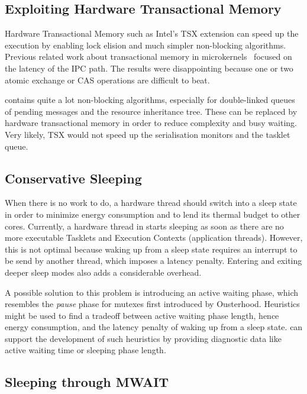 \subsection{Exploiting Hardware Transactional Memory}
Hardware Transactional Memory such as Intel's TSX extension can speed
up the execution by enabling lock elision and much simpler
non-blocking algorithms.  Previous related work about transactional
memory in
microkernels~\cite{smejkal2015transactional,fuchs2014hardware} focused
on the latency of the IPC path.  The results were disappointing
because one or two atomic exchange or CAS operations are difficult to
beat.

\mythos contains quite a lot non-blocking algorithms, especially for
double-linked queues of pending messages and the resource inheritance
tree. These can be replaced by hardware transactional memory in order
to reduce complexity and busy waiting. Very likely, TSX would not
speed up the serialisation monitors and the tasklet queue.

\subsection{Conservative Sleeping}

When there is no work to do, a hardware thread should switch into a
sleep state in order to minimize energy consumption and to lend its
thermal budget to other cores.  Currently, a hardware thread in
\mythos starts sleeping as soon as there are no more executable
Tasklets and Execution Contexts (application threads).  However, this
is not optimal because waking up from a sleep state requires an
interrupt to be send by another thread, which imposes a latency
penalty. Entering and exiting deeper sleep modes also adds a
considerable overhead.

A possible solution to this problem is introducing an active waiting
phase, which resembles the \emph{pause} phase for mutexes first
introduced by Ousterhood.  Heuristics might be used to find a tradeoff
between active waiting phase length, hence energy consumption, and the
latency penalty of waking up from a sleep state. \mythos can support
the development of such heuristics by providing diagnostic data like
active waiting time or sleeping phase length.

\subsection{Sleeping through MWAIT}

